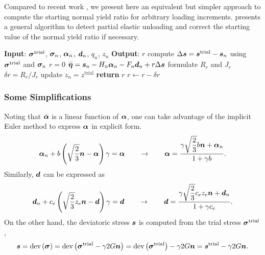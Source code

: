 Compared to recent work \cite{Hashiguchi2018,Anjiki2019}, we present here an equivalent but simpler approach to compute the starting normal yield ratio for arbitrary loading increments.
 presents a general algorithm to detect partial elastic unloading and correct the starting value of the normal yield ratio if necessary.
\begin{breakablealgorithm}
    \caption{correct starting value of normal yield ratio $z$}\label{algo:loading_criterion}
    \begin{algorithmic}[1]
        \State \textbf{Input}: $\bm{\sigma}^\text{trial}$, $\bm{\sigma}_n$, $\bm{\alpha}_{n}$, $\bm{d}_n$, $q_n$, $z_n$
        \State \textbf{Output}: $r$
        \State compute $\Delta\bm{s}=\bm{s}^\text{trial}-\bm{s}_n$ using $\bm{\sigma}^\text{trial}$ and $\bm{\sigma}_n$
        \State $r=0$
        \State $\bar{\bm{\eta}}=\bm{s}_n-H_n\bm{\alpha}_n-F_n\bm{d}_n+r\Delta\bm{s}$
        \State formulate $R_r$ and $J_r$
        \State $\delta{}r=R_r/J_r$
        \State update $z_{n}=z^\text{trial}$
        \EndIf
        \State \textbf{return} $r$
        \EndIf
        \State $r\leftarrow{}r-\delta{}r$
        \EndWhile
    \end{algorithmic}
\end{breakablealgorithm}
\subsubsection{Some Simplifications}
Noting that $\dot{\bm{\alpha}}$ is a linear function of $\bm{\alpha}$, one can take advantage of the implicit Euler method to express $\bm{\alpha}$ in explicit form.
\begin{gather}\label{eq:explicit_alpha}
    \bm{\alpha}_n+b\left(\sqrt{\dfrac{2}{3}}\bm{n}-\bm{\alpha}\right)\gamma=\bm{\alpha}\qquad\rightarrow\qquad
    \bm{\alpha}=\dfrac{\gamma\sqrt{\dfrac{2}{3}}b\bm{n}+\bm{\alpha}_n}{1+\gamma{}b}.
\end{gather}
Similarly, $\bm{d}$ can be expressed as
\begin{gather}\label{eq:explicit_d}
    \bm{d}_n+c_e\left(\sqrt{\dfrac{2}{3}}z_e\bm{n}-\bm{d}\right)\gamma=\bm{d}\qquad\rightarrow\qquad\bm{d}=\dfrac{\gamma{}\sqrt{\dfrac{2}{3}}c_ez_e\bm{n}+\bm{d}_n}{1+\gamma{}c_e}.
\end{gather}
On the other hand, the deviatoric stress $\bm{s}$ is computed from the trial stress $\bm{\sigma}^\text{trial}$,
\begin{gather}
    \bm{s}=\text{dev}\left(\bm{\sigma}\right)=\text{dev}\left(\bm{\sigma}^\text{trial}-\gamma2G\bm{n}\right)=\text{dev}\left(\bm{\sigma}^\text{trial}\right)-\gamma2G\bm{n}=\bm{s}^\text{trial}-\gamma2G\bm{n}.
\end{gather}

